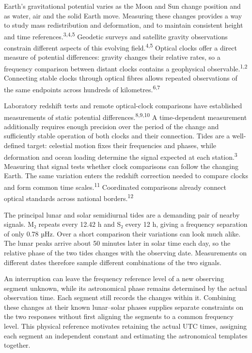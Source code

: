 \documentclass[
  12pt,
  a4paper,
]{article}
\begin{document}
\clearpage

Earth's gravitational potential varies as the Moon and Sun change
position and as water, air and the solid Earth move. Measuring these
changes provides a way to study mass redistribution and deformation, and
to maintain consistent height and time
references.\textsuperscript{3,4,5} Geodetic surveys and satellite
gravity observations constrain different aspects of this evolving
field.\textsuperscript{4,5} Optical clocks offer a direct measure of
potential differences: gravity changes their relative rates, so a
frequency comparison between distant clocks contains a geophysical
observable.\textsuperscript{1,2} Connecting stable clocks through
optical fibres allows repeated observations of the same endpoints across
hundreds of kilometres.\textsuperscript{6,7}

Laboratory redshift tests and remote optical-clock comparisons have
established measurements of static potential
differences.\textsuperscript{8,9,10} A time-dependent measurement
additionally requires enough precision over the period of the change and
sufficiently stable operation of both clocks and their connection. Tides
are a well-defined target: celestial motion fixes their frequencies and
phases, while deformation and ocean loading determine the signal
expected at each station.\textsuperscript{3} Measuring that signal tests
whether clock comparisons can follow the changing Earth. The same
variation enters the redshift correction needed to compare clocks and
form common time scales.\textsuperscript{11} Coordinated comparisons
already connect optical standards across national
borders.\textsuperscript{12}

The principal lunar and solar semidiurnal tides are a demanding pair of
nearby signals. M₂ repeats every 12.42 h and S₂ every 12 h, giving a
frequency separation of only 0.78 µHz. Over a short comparison their
variations can look much alike. The lunar peaks arrive about 50 minutes
later in solar time each day, so the relative phase of the two tides
changes with the observing date. Measurements on different dates
therefore sample different combinations of the two signals.

An interruption can leave the frequency reference level of a new
observing segment unknown, while its astronomical phase remains
determined by the actual observation time. Each segment still records
the changes within it. Combining these changes at their known
lunar--solar phases supplies separate constraints on the two responses
without first aligning the segments to a common frequency level. This
physical reference motivates retaining the actual UTC times, assigning
each segment an independent constant and estimating the astronomical
templates together.
\end{document}
